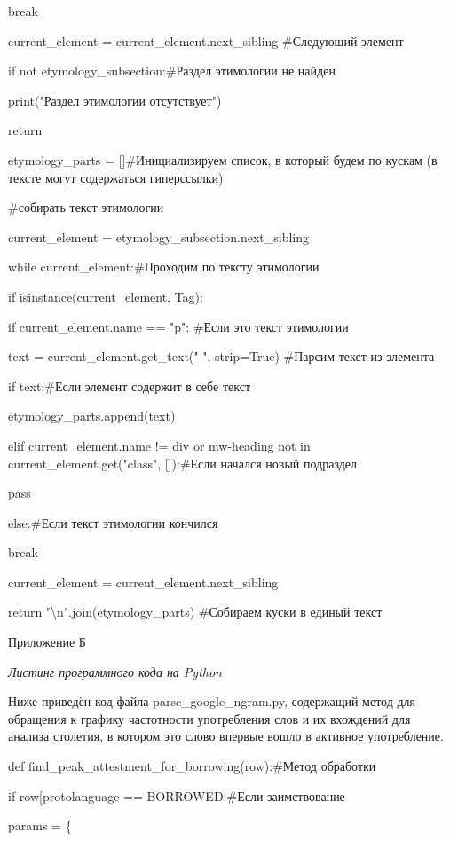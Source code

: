 break

current\_element = current\_element.next\_sibling \#Следующий элемент

if not etymology\_subsection:\#Раздел этимологии не найден

print("Раздел этимологии отсутствует")

return

etymology\_parts = {[}{]}\#Инициализируем список, в который будем по кускам (в тексте могут содержаться гиперссылки)

\#собирать текст этимологии

current\_element = etymology\_subsection.next\_sibling

while current\_element:\#Проходим по тексту этимологии

if isinstance(current\_element, Tag):

if current\_element.name == "p": \#Если это текст этимологии

text = current\_element.get\_text(" ", strip=True) \#Парсим текст из элемента

if text:\#Если элемент содержит в себе текст

etymology\_parts.append(text)

elif current\_element.name != \textquotesingle div\textquotesingle{} or \textquotesingle mw-heading\textquotesingle{} not in current\_element.get("class", {[}{]}):\#Если начался новый подраздел

pass

else:\#Если текст этимологии кончился

break

current\_element = current\_element.next\_sibling

return "\textbackslash n".join(etymology\_parts) \#Собираем куски в единый текст

Приложение Б

\emph{Листинг программного кода на Python}

Ниже приведён код файла parse\_google\_ngram.py, содержащий метод для обращения к графику частотности употребления слов и их вхождений для анализа столетия, в котором это слово впервые вошло в активное употребление.

def find\_peak\_attestment\_for\_borrowing(row):\#Метод обработки

if row{[}\textquotesingle protolanguage\textquotesingle{]} == \textquotesingle BORROWED\textquotesingle:\#Если заимствование

params = \{

